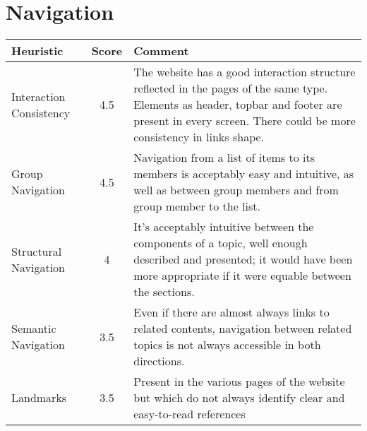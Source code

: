 \section{Navigation}
\begin{table}[H]
  \begin{center}
    \label{tab:table1}
    \begin{tabular}{||l|c|p{8cm}||} %
      \textbf{Heuristic} & \textbf{Score} & \textbf{Comment}\\
      
      \hline
      Interaction Consistency & 4.5 & The website has a good interaction structure reflected in the pages of the same type. Elements as header, topbar and footer are present in every screen. There could be more consistency in links shape.\\
      \hline
      Group Navigation & 4.5 & Navigation from a list of items to its members is acceptably easy and intuitive, as well as between group members and from group member to the list.\\
      \hline
      Structural Navigation & 4 & It's acceptably intuitive between the components of a topic, well enough described and presented; it would have been more appropriate if it were equable between the sections.\\
      \hline
      Semantic Navigation & 3.5 & Even if there are almost always links to related contents, navigation between related topics is not always accessible in both directions.\\
      Landmarks & 3.5 & Present in the various pages of the website but which do not always identify clear and easy-to-read references\\

    \end{tabular}
  \end{center}
\end{table}


